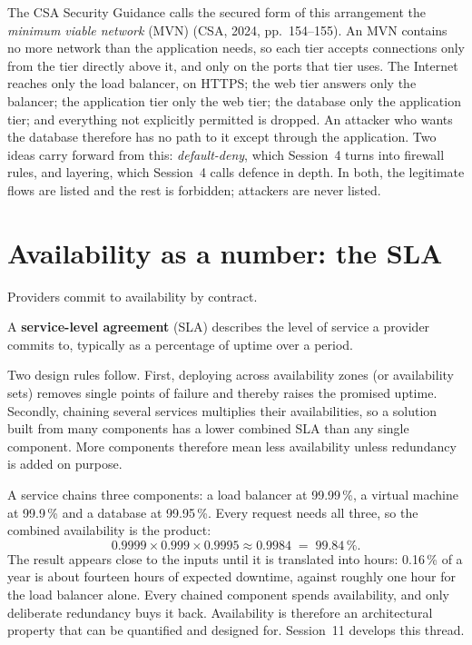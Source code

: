 The CSA Security Guidance calls the secured form of this arrangement the
\emph{minimum viable network} (MVN) (CSA, 2024, pp.~154--155). An MVN
contains no more network than the application needs, so each tier accepts
connections only from the tier directly above it, and only on the ports that
tier uses. The Internet reaches only the load balancer, on HTTPS; the web
tier answers only the balancer; the application tier only the web tier; the
database only the application tier; and everything not explicitly permitted
is dropped. An attacker who wants the database therefore has no path to it
except through the application. Two ideas carry forward from this:
\emph{default-deny}, which Session~4 turns into firewall rules, and
layering, which Session~4 calls defence in depth. In both, the legitimate
flows are listed and the rest is forbidden; attackers are never listed.

\section{Availability as a number: the SLA}

Providers commit to availability by contract.

\begin{definition}\label{def:sla}
A \textbf{service-level agreement} (SLA) describes the level of service a
provider commits to, typically as a percentage of uptime over a period.
\end{definition}

Two design rules follow. First, deploying across availability zones (or
availability sets) removes single points of failure and thereby raises the
promised uptime. Secondly, chaining several services multiplies their
availabilities, so a solution built from many components has a lower
combined SLA than any single component. More components therefore mean less
availability unless redundancy is added on purpose.

\begin{example}\label{ex:compositesla}
A service chains three components: a load balancer at 99.99\,\%, a virtual
machine at 99.9\,\% and a database at 99.95\,\%. Every request needs all three,
so the combined availability is the product:
\[
  0.9999 \times 0.999 \times 0.9995 \approx 0.9984 \;=\; 99.84\,\%.
\]
The result appears close to the inputs until it is translated into hours:
0.16\,\% of a year is about fourteen hours of expected downtime, against
roughly one hour for the load balancer alone. Every chained component spends
availability, and only deliberate redundancy buys it back. Availability is
therefore an architectural property that can be quantified and designed for. Session~11 develops this thread.
\end{example}

